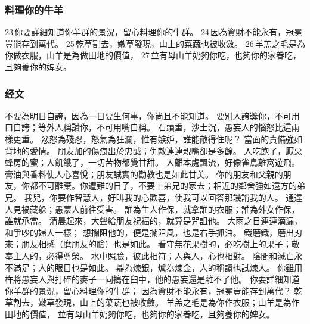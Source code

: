 \subsubsection{料理你的牛羊}
23 你要詳細知道你羊群的景況，留心料理你的牛群。 24 因為資財不能永有，冠冕豈能存到萬代。 25 乾草割去，嫩草發現，山上的菜蔬也被收斂。 26 羊羔之毛是為你做衣服，山羊是為做田地的價值， 27 並有母山羊奶夠你吃，也夠你的家眷吃，且夠養你的婢女。

\subsubsection{经文}
不要為明日自誇，因為一日要生何事，你尚且不能知道。
要別人誇獎你，不可用口自誇；等外人稱讚你，不可用嘴自稱。
石頭重，沙土沉，愚妄人的惱怒比這兩樣更重。
忿怒為殘忍，怒氣為狂瀾，惟有嫉妒，誰能敵得住呢？
當面的責備強如背地的愛情。
朋友加的傷痕出於忠誠；仇敵連連親嘴卻是多餘。
人吃飽了，厭惡蜂房的蜜；人飢餓了，一切苦物都覺甘甜。
人離本處飄流，好像雀鳥離窩遊飛。
膏油與香料使人心喜悅；朋友誠實的勸教也是如此甘美。
你的朋友和父親的朋友，你都不可離棄。你遭難的日子，不要上弟兄的家去；相近的鄰舍強如遠方的弟兄。
我兒，你要作智慧人，好叫我的心歡喜，使我可以回答那譏誚我的人。
通達人見禍藏躲；愚蒙人前往受害。
誰為生人作保，就拿誰的衣服；誰為外女作保，誰就承當。
清晨起來，大聲給朋友祝福的，就算是咒詛他。
大雨之日連連滴漏，和爭吵的婦人一樣；
想攔阻他的，便是攔阻風，也是右手抓油。
鐵磨鐵，磨出刃來；朋友相感（磨朋友的臉）也是如此。
看守無花果樹的，必吃樹上的果子；敬奉主人的，必得尊榮。
水中照臉，彼此相符；人與人，心也相對。
陰間和滅亡永不滿足；人的眼目也是如此。
鼎為煉銀，爐為煉金，人的稱讚也試煉人。
你雖用杵將愚妄人與打碎的麥子一同搗在臼中，他的愚妄還是離不了他。
你要詳細知道你羊群的景況，留心料理你的牛群；
因為資財不能永有，冠冕豈能存到萬代？
乾草割去，嫩草發現，山上的菜蔬也被收斂。
羊羔之毛是為你作衣服；山羊是為作田地的價值，
並有母山羊奶夠你吃，也夠你的家眷吃，且夠養你的婢女。

